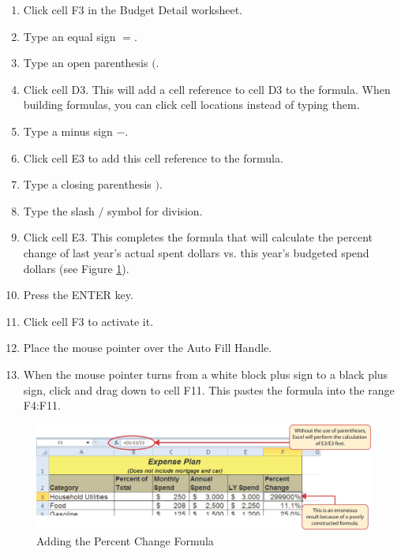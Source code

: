 \begin{enumerate}
	\item Click cell \textsf{F3} in the Budget Detail worksheet.
	\item Type an equal sign $ = $.
	\item Type an open parenthesis $ ( $.
	\item Click cell \textsf{D3}. This will add a cell reference to cell \textsf{D3} to the formula. When building formulas, you can click cell locations instead of typing them.
	\item Type a minus sign $ - $.
	\item Click cell \textsf{E3} to add this cell reference to the formula.
	\item Type a closing parenthesis $ ) $.
	\item Type the slash $ / $ symbol for division.
	\item Click cell \textsf{E3}. This completes the formula that will calculate the percent change of last year's actual spent dollars vs. this year's budgeted spend dollars (see Figure \ref{02:fig06}).
	\item Press the ENTER key.
	\item Click cell \textsf{F3} to activate it.
	\item Place the mouse pointer over the Auto Fill Handle.
	\item When the mouse pointer turns from a white block plus sign to a black plus sign, click and drag down to cell \textsf{F11}. This pastes the formula into the range \textsf{F4:F11}.
\end{enumerate}

\begin{figure}[H]
	\centering
	\includegraphics[width=\maxwidth{.95\linewidth}]{gfx/ch02_fig06}
	\caption{Adding the Percent Change Formula}
	\label{02:fig06}
\end{figure}

